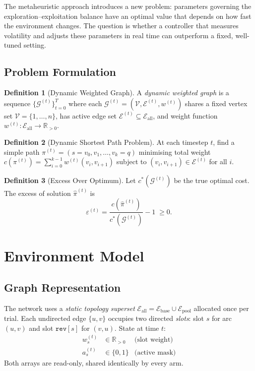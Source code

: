 \documentclass[11pt,a4paper]{article}
\theoremstyle{definition}
\newtheorem{definition}{Definition}[section]
\newcommand{\calG}{\mathcal{G}}
\newcommand{\calE}{\mathcal{E}}
\newcommand{\calV}{\mathcal{V}}
\newcommand{\RR}{\mathbb{R}}
\newcommand{\excess}{\varepsilon}
\begin{document}
The metaheuristic approach introduces a new problem: parameters governing the
exploration--exploitation balance have an optimal value that depends on how fast the
environment changes.  The question is whether a controller that measures volatility and
adjusts these parameters in real time can outperform a fixed, well-tuned setting.

\subsection{Problem Formulation}

\begin{definition}[Dynamic Weighted Graph]
  A \emph{dynamic weighted graph} is a sequence $\{\calG^{(t)}\}_{t=0}^{T}$ where each
  $\calG^{(t)} = (\calV,\calE^{(t)},w^{(t)})$ shares a fixed vertex set
  $\calV = \{1,\ldots,n\}$, has active edge set
  $\calE^{(t)} \subseteq \calE_{\text{all}}$, and weight function
  $w^{(t)}:\calE_{\text{all}} \to \RR_{>0}$.
\end{definition}

\begin{definition}[Dynamic Shortest Path Problem]
  At each timestep $t$, find a simple path $\pi^{(t)} = (s=v_0,v_1,\ldots,v_k=q)$
  minimising total weight
  $c(\pi^{(t)}) = \sum_{i=0}^{k-1}w^{(t)}(v_i,v_{i+1})$
  subject to $(v_i,v_{i+1})\in\calE^{(t)}$ for all $i$.
\end{definition}

\begin{definition}[Excess Over Optimum]
  Let $c^*(\calG^{(t)})$ be the true optimal cost.  The excess of solution
  $\hat\pi^{(t)}$ is
  \[
    \excess^{(t)} = \frac{c(\hat\pi^{(t)})}{c^*(\calG^{(t)})} - 1 \;\ge 0.
  \]
\end{definition}

\section{Environment Model}
\label{sec:environment}

\subsection{Graph Representation}

The network uses a \emph{static topology superset}
$\calE_{\text{all}} = \calE_{\text{base}} \cup \calE_{\text{pool}}$
allocated once per trial.  Each undirected edge $\{u,v\}$ occupies two directed
\emph{slots}: slot $s$ for arc $(u,v)$ and slot $\texttt{rev}[s]$ for $(v,u)$.
State at time $t$:
\begin{align}
  w^{(t)}_s &\in \RR_{>0} &\text{(slot weight)}\\
  a^{(t)}_s &\in \{0,1\} &\text{(active mask)}
\end{align}
Both arrays are read-only, shared identically by every arm.
\end{document}
